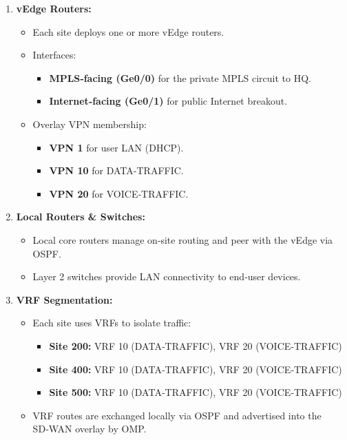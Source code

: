 \documentclass[12pt,english]{report}
\begin{document}
\begin{enumerate}
    \item \textbf{vEdge Routers:}
    \begin{itemize}
        \item Each site deploys one or more vEdge routers.
        \item Interfaces:
        \begin{itemize}
            \item \textbf{MPLS‐facing (Ge0/0)} for the private MPLS circuit to HQ.
            \item \textbf{Internet‐facing (Ge0/1)} for public Internet breakout.
        \end{itemize}
        \item Overlay VPN membership:
        \begin{itemize}
            \item \textbf{VPN 1} for user LAN (DHCP).
            \item \textbf{VPN 10} for DATA‑TRAFFIC.
            \item \textbf{VPN 20} for VOICE‑TRAFFIC.
        \end{itemize}
    \end{itemize}

    \item \textbf{Local Routers \& Switches:}
    \begin{itemize}
        \item Local core routers manage on‐site routing and peer with the vEdge via OSPF.
        \item Layer 2 switches provide LAN connectivity to end‑user devices.
    \end{itemize}

    \item \textbf{VRF Segmentation:}
    \begin{itemize}
        \item Each site uses VRFs to isolate traffic:
        \begin{itemize}
            \item \textbf{Site 200:} VRF 10 (DATA‑TRAFFIC), VRF 20 (VOICE‑TRAFFIC)
            \item \textbf{Site 400:} VRF 10 (DATA‑TRAFFIC), VRF 20 (VOICE‑TRAFFIC)
            \item \textbf{Site 500:} VRF 10 (DATA‑TRAFFIC), VRF 20 (VOICE‑TRAFFIC)
        \end{itemize}
        \item VRF routes are exchanged locally via OSPF and advertised into the SD‑WAN overlay by OMP.
    \end{itemize}


\end{enumerate}
\end{document}
